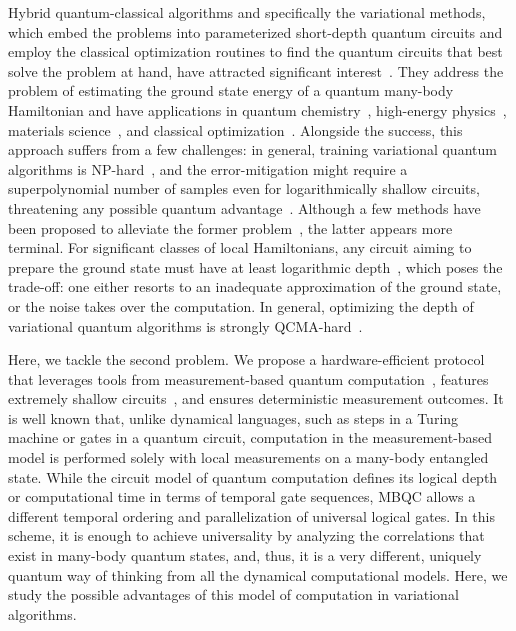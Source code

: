 \documentclass[../main.tex]{subfiles}
\begin{document}
Hybrid quantum-classical algorithms and specifically the variational methods, which embed the
problems into parameterized short-depth quantum circuits and employ
the classical optimization routines to find the quantum
circuits that best solve the problem at hand, have attracted significant interest~\cite{moll2018quantum,mcclean2016theory,preskill2018quantum,peruzzo2014variational}. They address the problem of estimating the ground state energy of a quantum many-body Hamiltonian and have applications in quantum chemistry~\cite{tilly2022variational,peruzzo2014variational,amsler2023classical}, high-energy physics~\cite{banuls2020simulating,kokail2019self,atas20212}, materials science~\cite{bauer2016hybrid}, and classical
optimization~\cite{bravo2019variational,borle2021quantum}. Alongside the success, this approach suffers from a few challenges: in general, training variational quantum algorithms is NP-hard~\cite{bittel2021training}, and the error-mitigation might require a superpolynomial number of samples even for logarithmically shallow circuits, threatening any possible quantum advantage~\cite{quek2022exponentially}. Although a few methods have been proposed to alleviate the former problem~\cite{bittel2022fast,zhou2020quantum,grimsley2019adaptive,grimsley2023adaptive,wierichs2020avoiding}, the latter appears more terminal. For significant classes of local Hamiltonians, any circuit aiming to prepare the ground state must have at least logarithmic depth~\cite{de2023limitations,bravyi2020obstacles,eldar2017local}, which poses the trade-off: one either resorts to an inadequate approximation of the ground state, or the noise takes over the computation. In general, optimizing the depth of variational quantum algorithms is strongly QCMA-hard~\cite{bittel2022optimizing}. 

Here, we tackle the second problem. We propose a hardware-efficient protocol that leverages tools from measurement-based quantum computation~\cite{raussendorf2003measurement,briegel2009measurement}, features extremely shallow circuits~\cite{broadbent2007parallelizing}, and ensures deterministic measurement outcomes. It is well known that, unlike dynamical languages, such as steps in a Turing machine or gates in a quantum circuit, computation in the measurement-based model is performed solely with local measurements on a many-body entangled state. While the circuit model of quantum computation defines its logical depth or computational time in terms of temporal gate sequences, MBQC allows a different temporal ordering and parallelization of universal logical gates. In this scheme, it is enough to achieve universality by analyzing the correlations that exist in many-body quantum states, and, thus, it is a very different, uniquely quantum way of thinking from all the dynamical computational models. Here, we study the possible advantages of this model of computation in variational algorithms. 
\end{document}
